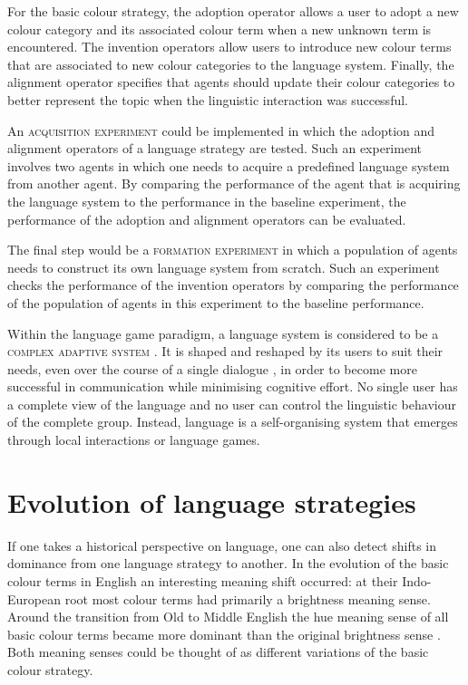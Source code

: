 For the basic colour strategy, the adoption operator allows a user to
adopt a new colour category and its associated colour term when a new
unknown term is encountered. The invention operators allow users to
introduce new colour terms that are associated to new colour
categories to the language system. Finally, the alignment operator
specifies that agents should update their colour categories to better
represent the topic when the linguistic interaction was successful.

An \textsc{acquisition experiment} could be implemented in which the
adoption and alignment operators of a language strategy are
tested. Such an experiment involves two agents in which one needs to
acquire a predefined language system from another agent. By comparing
the performance of the agent that is acquiring the language system to
the performance in the baseline experiment, the performance of the
adoption and alignment operators can be evaluated.

The final step would be a \textsc{formation experiment} in which a
population of agents needs to construct its own language system from
scratch. Such an experiment checks the performance of the invention
operators by comparing the performance of the population of agents in
this experiment to the baseline performance.

 
Within the language game paradigm, a language system is considered to
be a \textsc{complex adaptive system} \citep{steels00language}. It is shaped
and reshaped by its users to suit their needs, even over the course of
a single dialogue \citep{garrod94conversation}, in order to become
more successful in communication while minimising cognitive effort. No
single user has a complete view of the language and no user can
control the linguistic behaviour of the complete group. Instead,
language is a self-organising system that emerges through local
interactions or language games.

\section{Evolution of language strategies}

If one takes a historical perspective on language, one can also
detect shifts in dominance from one language strategy to another. In
the evolution of the basic colour terms in English an interesting
meaning shift occurred: at their Indo-European root most colour terms
had primarily a brightness meaning sense. Around the transition from
Old to Middle English the hue meaning sense of all basic colour terms became
more dominant than the original brightness sense
\citep{casson97shift}. Both meaning senses could be thought of as
different variations of the basic colour strategy.


